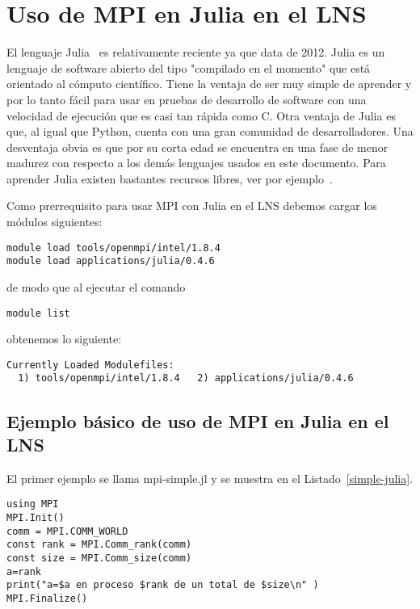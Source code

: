 \documentclass[letter]{jpconf}
\begin{document}


\section{Uso de MPI en Julia en el LNS}

El lenguaje Julia~\cite{julia} es relativamente reciente ya que data de 2012. Julia es un lenguaje de software abierto del tipo "compilado en el momento" que est\'a orientado al c\'omputo cient\'ifico. Tiene la ventaja de ser muy simple de aprender y por lo tanto f\'acil para usar en pruebas de desarrollo de software con una velocidad de ejecuci\'on que es casi tan r\'apida como C. Otra ventaja de Julia es que, al igual que Python, cuenta con una gran comunidad de desarrolladores. Una desventaja obvia es que por su corta edad se encuentra en una fase de menor madurez con respecto a los dem\'as lenguajes usados en este documento. Para aprender Julia existen bastantes recursos libres, ver por ejemplo~\cite{julialearn}.

Como prerrequisito para usar MPI con Julia en el LNS debemos cargar los m\'odulos siguientes:
\color{blue}
\begin{verbatim}
module load tools/openmpi/intel/1.8.4
module load applications/julia/0.4.6
\end{verbatim}
\color{black}
de modo que al ejecutar el comando
\color{blue}
\begin{verbatim}
module list
\end{verbatim}
\color{black}
obtenemos lo siguiente:
\color{brown}
\begin{verbatim}
Currently Loaded Modulefiles:
  1) tools/openmpi/intel/1.8.4   2) applications/julia/0.4.6
\end{verbatim}
\color{black}

\subsection{Ejemplo b\'asico de uso de MPI en Julia en el LNS}

El primer ejemplo se llama mpi-simple.jl y se muestra en el Listado~\ref{simple-julia}.
\begin{lstlisting}[float,floatplacement=H,label=simple-julia,caption=Listado del programa  \texttt{mpi-simple.jl} en Julia]
using MPI
MPI.Init()
comm = MPI.COMM_WORLD
const rank = MPI.Comm_rank(comm)
const size = MPI.Comm_size(comm)
a=rank
print("a=$a en proceso $rank de un total de $size\n" )
MPI.Finalize()
\end{lstlisting}
\end{document}
